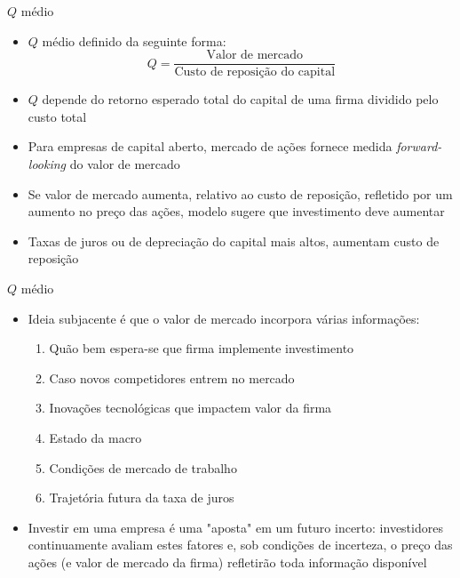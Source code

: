 \documentclass[10pt]{beamer}
\begin{document}
\begin{frame}
    {$Q$ médio}
    \begin{itemize}
        \item $Q$ médio definido da seguinte forma:
        \begin{equation}
            Q = \frac{\text{Valor de mercado}}{\text{Custo de reposição do capital}}\label{aula8_eq9}
        \end{equation}
        \item $Q$ depende do retorno esperado total do capital de uma firma dividido pelo custo total\bigskip
        \item Para empresas de capital aberto, mercado de ações fornece medida \emph{forward-looking} do valor de mercado\bigskip
        \item Se valor de mercado aumenta, relativo ao custo de reposição, refletido por um aumento no preço das ações, modelo sugere que investimento deve aumentar\bigskip
        \item Taxas de juros ou de depreciação do capital mais altos, aumentam custo de reposição
    \end{itemize}
\end{frame}

\begin{frame}
    {$Q$ médio}
    \begin{itemize}
        \item Ideia subjacente é que o valor de mercado incorpora várias informações:\bigskip
        \begin{enumerate}
            \item Quão bem espera-se que firma implemente investimento\medskip
            \item Caso novos competidores entrem no mercado\medskip
            \item Inovações tecnológicas que impactem valor da firma\medskip
            \item Estado da macro\medskip
            \item Condições de mercado de trabalho\medskip
            \item Trajetória futura da taxa de juros\bigskip
        \end{enumerate}
        \item Investir em uma empresa é uma "aposta" em um futuro incerto: investidores continuamente avaliam estes fatores e, sob condições de incerteza, o preço das ações (e valor de mercado da firma) refletirão toda informação disponível
    \end{itemize}
\end{frame}
\end{document}
